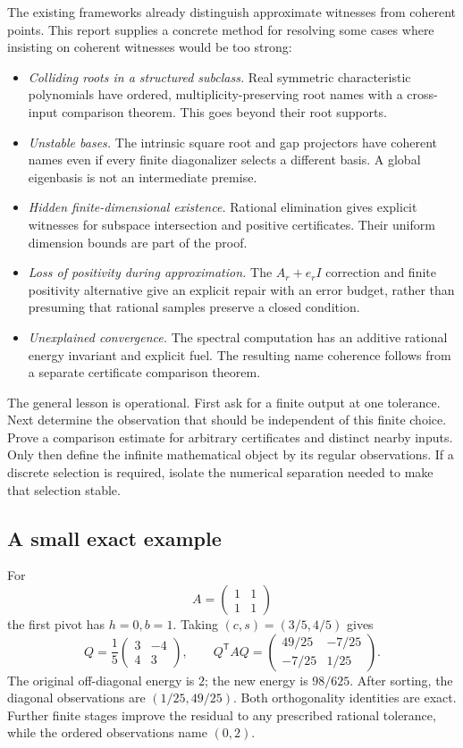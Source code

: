 The existing frameworks already distinguish approximate witnesses from coherent points. This report supplies a concrete method for resolving some cases where insisting on coherent witnesses would be too strong:
\begin{itemize}
\item \emph{Colliding roots in a structured subclass.} Real symmetric characteristic polynomials have ordered, multiplicity-preserving root names with a cross-input comparison theorem. This goes beyond their root supports.
\item \emph{Unstable bases.} The intrinsic square root and gap projectors have coherent names even if every finite diagonalizer selects a different basis. A global eigenbasis is not an intermediate premise.
\item \emph{Hidden finite-dimensional existence.} Rational elimination gives explicit witnesses for subspace intersection and positive certificates. Their uniform dimension bounds are part of the proof.
\item \emph{Loss of positivity during approximation.} The $A_r+e_rI$ correction and finite positivity alternative give an explicit repair with an error budget, rather than presuming that rational samples preserve a closed condition.
\item \emph{Unexplained convergence.} The spectral computation has an additive rational energy invariant and explicit fuel. The resulting name coherence follows from a separate certificate comparison theorem.
\end{itemize}

The general lesson is operational. First ask for a finite output at one tolerance. Next determine the observation that should be independent of this finite choice. Prove a comparison estimate for arbitrary certificates and distinct nearby inputs. Only then define the infinite mathematical object by its regular observations. If a discrete selection is required, isolate the numerical separation needed to make that selection stable.

\subsection{A small exact example}

For
\[
 A=\begin{pmatrix}1&1\\1&1\end{pmatrix}
\]
the first pivot has $h=0,b=1$. Taking $(c,s)=(3/5,4/5)$ gives
\[
 Q=\frac15\begin{pmatrix}3&-4\\4&3\end{pmatrix},\qquad
 Q^{\mathsf T}AQ=
 \begin{pmatrix}49/25&-7/25\\-7/25&1/25\end{pmatrix}.
\]
The original off-diagonal energy is $2$; the new energy is $98/625$. After sorting, the diagonal observations are $(1/25,49/25)$. Both orthogonality identities are exact. Further finite stages improve the residual to any prescribed rational tolerance, while the ordered observations name $(0,2)$.

